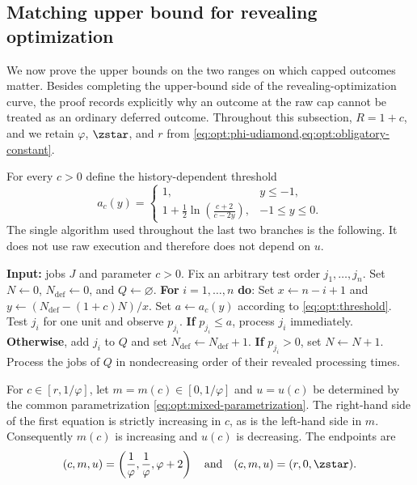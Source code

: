 \subsection{Matching upper bound for revealing optimization}
\label{sec:optional-upper}

We now prove the upper bounds on the two ranges on which capped outcomes
matter.  Besides completing the upper-bound side of the revealing-optimization curve,
the proof records explicitly why an outcome at the raw cap cannot be
treated as an ordinary deferred outcome.  Throughout this subsection,
$R=1+c$, and we retain $\varphi$, $\zstar$, and $r$ from
\cref{eq:opt:phi-udiamond,eq:opt:obligatory-constant}.

For every $c>0$ define the history-dependent threshold
\begin{equation}
 a_c(y)=
 \begin{cases}
  1, & y\le-1,\\[1mm]
  \displaystyle
  1+\frac12\ln\!\left(\frac{c+2}{c-2y}\right),
      & -1\le y\le0.
 \end{cases}
 \label{eq:opt:threshold}
\end{equation}
The single algorithm used throughout the last two branches is the following.
It does not use raw execution and therefore does not depend on $u$.

\begin{algorithm}[H]
\caption{\textsc{AdaptiveThreshold}$(J,c)$}
\label{alg:adaptive-threshold}
\begin{algorithmic}
\Statex \textbf{Input:} jobs $J$ and parameter $c>0$.
\State Fix an arbitrary test order $j_1,\ldots,j_n$.
\State Set $N\gets0$, $N_{\mathrm{def}}\gets0$, and $Q\gets\varnothing$.
\State \textbf{For} $i=1,\ldots,n$ \textbf{do}:
\State \quad Set $x\gets n-i+1$ and $y\gets(N_{\mathrm{def}}-(1+c)N)/x$.
\State \quad Set $a\gets a_c(y)$ according to \cref{eq:opt:threshold}.
\State \quad Test $j_i$ for one unit and observe $p_{j_i}$.
\State \quad \textbf{If} $p_{j_i}\le a$, process $j_i$ immediately.
\State \quad \textbf{Otherwise}, add $j_i$ to $Q$ and set $N_{\mathrm{def}}\gets N_{\mathrm{def}}+1$.
\State \quad \textbf{If} $p_{j_i}>0$, set $N\gets N+1$.
\State Process the jobs of $Q$ in nondecreasing order of their revealed
       processing times.
\end{algorithmic}
\end{algorithm}

For $c\in[r,1/\varphi]$, let $m=m(c)\in[0,1/\varphi]$ and $u=u(c)$ be
determined by the common parametrization
\cref{eq:opt:mixed-parametrization}.
The right-hand side of the first equation is strictly increasing in $c$,
as is the left-hand side in $m$.  Consequently $m(c)$ is increasing and
$u(c)$ is decreasing.  The endpoints are
\[
 (c,m,u)=\left(\frac1\varphi,\frac1\varphi,\varphi+2\right)
 \quad\text{and}\quad
 (c,m,u)=(r,0,\zstar).
\]


